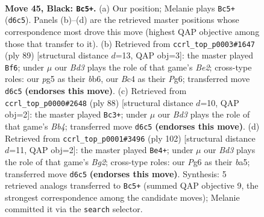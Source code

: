\documentclass[11pt]{article}
\begin{document}
\clearpage

\begin{figure}[p]\centering
\begin{subfigure}{0.46\textwidth}\centering
\resizebox{\linewidth}{!}{%
\newchessgame
\chessboard[
  setfen={8/2k5/3b2p1/6P1/p1b5/4K3/8/6N1 b - - 0 45},
  showmover=false,
  pgfstyle=straightmove, color=movearrow, markmove={d6-c5}
]}
\caption{}
\end{subfigure}\hfill
\begin{subfigure}{0.46\textwidth}\centering
\resizebox{\linewidth}{!}{%
\newchessgame
\chessboard[
  setfen={8/4b3/1B1k2p1/1P6/4K3/8/8/8 b - - 4 45},
  showmover=false,
  pgfstyle=straightmove, color=movearrow, markmove={e7-f6}
]}
\caption{}
\end{subfigure}
\\[4pt]
\begin{subfigure}{0.46\textwidth}\centering
\resizebox{\linewidth}{!}{%
\newchessgame
\chessboard[
  setfen={8/6p1/4b3/2K1k3/1B5P/8/5P2/8 w - - 0 45},
  showmover=false,
  pgfstyle=straightmove, color=movearrow, markmove={b4-c3}
]}
\caption{}
\end{subfigure}\hfill
\begin{subfigure}{0.46\textwidth}\centering
\resizebox{\linewidth}{!}{%
\newchessgame
\chessboard[
  setfen={8/7k/8/b3P2p/8/7K/6B1/8 w - - 1 52},
  showmover=false,
  pgfstyle=straightmove, color=movearrow, markmove={g2-e4}
]}
\caption{}
\end{subfigure}
\caption{\textbf{Move 45, Black: \texttt{Bc5+}.} (a) Our position; Melanie plays \texttt{Bc5+} (\texttt{d6c5}). Panels (b)--(d) are the retrieved master positions whose correspondence most drove this move (highest QAP objective among those that transfer to it). (b) Retrieved from \texttt{ccrl\_top\_p0003\#1647} (ply 89) [structural distance $d$=13, QAP obj=3]: the master played \texttt{Bf6}; under $\mu$ our \emph{Bd3} plays the role of that game's \emph{Be2}; cross-type roles: our \emph{p}g5 as their \emph{b}b6, our \emph{B}c4 as their \emph{P}g6; transferred move \texttt{d6c5} \textbf{(endorses this move)}. (c) Retrieved from \texttt{ccrl\_top\_p0000\#2648} (ply 88) [structural distance $d$=10, QAP obj=2]: the master played \texttt{Bc3+}; under $\mu$ our \emph{Bd3} plays the role of that game's \emph{Bb4}; transferred move \texttt{d6c5} \textbf{(endorses this move)}. (d) Retrieved from \texttt{ccrl\_top\_p0001\#3496} (ply 102) [structural distance $d$=11, QAP obj=2]: the master played \texttt{Be4+}; under $\mu$ our \emph{Bd3} plays the role of that game's \emph{Bg2}; cross-type roles: our \emph{P}g6 as their \emph{b}a5; transferred move \texttt{d6c5} \textbf{(endorses this move)}. Synthesis: 5 retrieved analogs transferred to \texttt{Bc5+} (summed QAP objective 9, the strongest correspondence among the candidate moves); Melanie committed it via the \texttt{search} selector.}
\label{fig:thought-m89}
\end{figure}
\end{document}
